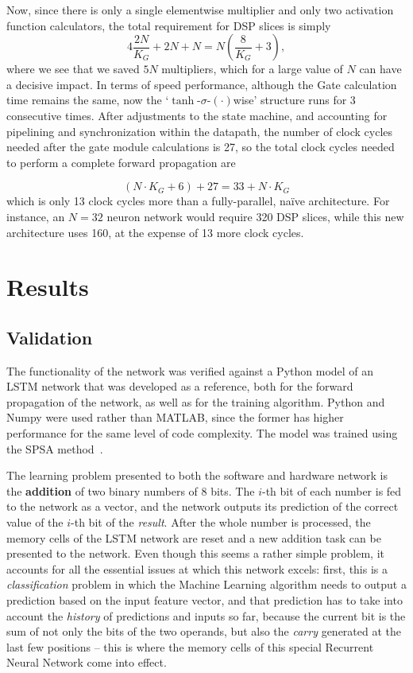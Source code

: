 \documentclass{IEEEtran}
\begin{document}
Now, since there is only a single elementwise multiplier and only two activation function calculators, the total requirement for DSP slices is simply
\begin{equation}\label{eq:numdsp_network-opt}
    4\frac{2N}{K_G} + 2N + N = N \left( \frac{8}{K_G} + 3 \right),
\end{equation}
where we see that we saved $5N$ multipliers, which for a large value of $N$ can have a decisive impact. In terms of speed performance, although the Gate
calculation time remains the same, now the `$\tanh$-$\sigma$-$(\cdot)$wise' structure runs for 3 consecutive times. After adjustments to the state machine, and accounting for
pipelining and synchronization within the datapath, the number of clock cycles needed after the gate module calculations is 27, so the total clock cycles needed to perform a
complete forward propagation are

\begin{equation}\label{eq:numcc_network-opt}
    (N \cdot K_G + 6) + 27  = 33 + N\cdot K_G
\end{equation}
which is only 13 clock cycles more than a fully-parallel, naïve architecture. For instance, an $N=32$ neuron network would
require 320 DSP slices, while this new architecture uses 160, at the expense of 13 more clock cycles.

\section{Results}\label{sec:results}

\subsection{Validation}\label{sec:res-val}

The functionality of the network was verified against a Python model of an LSTM network that was developed as a reference,
both for the forward propagation of the network, as well as for the training algorithm. Python and Numpy were used rather than MATLAB,
since the former has higher performance for the same level of code complexity. The model was trained using the SPSA method~\cite{Spall98}.

The learning problem presented to both the software and hardware network is the \textbf{addition} of two binary numbers of 8 bits. The $i$-th
bit of each number is fed to the network as a vector, and the network outputs its prediction of the correct value of the $i$-th bit
of the \emph{result}. After the whole number is processed, the memory cells of the LSTM network are reset and a new addition
task can be presented to the network. Even though this seems a rather simple problem, it accounts for all the essential issues at which this
network excels: first, this is a \emph{classification} problem in which the Machine Learning algorithm needs to output a prediction based on
the input feature vector, and that prediction has to take into account the \emph{history} of predictions and inputs so far, because the current
bit is the sum of not only the bits of the two operands, but also the \emph{carry} generated at the last few positions -- this is where the
memory cells of this special Recurrent Neural Network come into effect.
\end{document}
